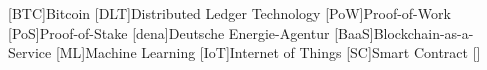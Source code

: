\begin{acronym}[BaaS]
	[BTC]{Bitcoin}
	[DLT]{Distributed Ledger Technology}
	[PoW]{Proof-of-Work}
	[PoS]{Proof-of-Stake}
	[dena]{Deutsche Energie-Agentur}
	[BaaS]{Blockchain-as-a-Service}
	[ML]{Machine Learning}
	[IoT]{Internet of Things}
	[SC]{Smart Contract}
	\acro{}[]{}
\end{acronym}

\listoffigures
{}
\newpage
